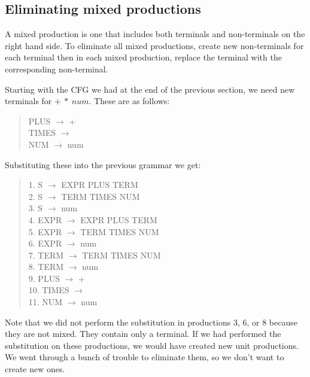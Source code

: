 \documentclass[letterpaper,12pt,openany,reqno]{book}%
\begin{document}
\subsection{Eliminating mixed productions}
A mixed production is one that includes both terminals and non-terminals on the right hand side. To eliminate all mixed productions, create new non-terminals for each terminal then in each mixed production, replace the terminal with the corresponding non-terminal. 

Starting with the CFG we had at the end of the previous section, we need new terminals for $+\ *\ num$. These are as follows:
\begin{quote}
{\ttfamily PLUS} $\rightarrow$ {\ttfamily +}\\
{\ttfamily TIMES} $\rightarrow$ {\ttfamily *}\\
{\ttfamily NUM} $\rightarrow$ {\ttfamily num}\\
\end{quote}
Substituting these into the previous grammar we get:
\begin{quote}
{1. \ttfamily S} $\rightarrow$ {\ttfamily EXPR PLUS TERM}\\
{2. \ttfamily S} $\rightarrow$ {\ttfamily TERM TIMES NUM}\\
{3. \ttfamily S} $\rightarrow$ {\ttfamily num}\\
{4. \ttfamily EXPR} $\rightarrow$ {\ttfamily EXPR PLUS TERM}\\
{5. \ttfamily EXPR} $\rightarrow$ {\ttfamily TERM TIMES NUM}\\
{6. \ttfamily EXPR} $\rightarrow$ {\ttfamily num}\\
{7. \ttfamily TERM} $\rightarrow$ {\ttfamily TERM TIMES NUM}\\
{8. \ttfamily TERM} $\rightarrow$ {\ttfamily num}\\
{9. \ttfamily PLUS} $\rightarrow$ {\ttfamily +}\\
{10. \ttfamily TIMES} $\rightarrow$ {\ttfamily *}\\
{11. \ttfamily NUM} $\rightarrow$ {\ttfamily num}\\
\end{quote}
Note that we did not perform the substitution in productions 3, 6, or 8 because they are not mixed. They contain only a terminal. If we had performed the substitution on these productions, we would have created new unit productions. We went through a bunch of trouble to eliminate them, so we don't want to create new ones.
\end{document}
